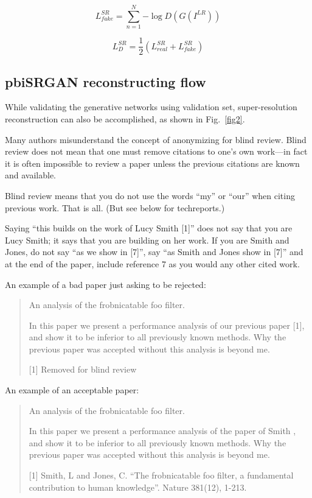 \documentclass[10pt,twocolumn,letterpaper]{article}
\begin{document}
\begin{equation}\label{8}
L_{fake}^{SR} = \sum\limits_{n = 1}^N { - \log D\left( {G\left( {{I^{LR}}} \right)} \right)}
\end{equation}

\begin{equation}\label{eq9}
L_D^{SR} = \frac{1}{2}\left( {L_{real}^{SR} + L_{fake}^{SR}} \right)
\end{equation}

\subsection{pbiSRGAN reconstructing flow}
While validating the generative networks using validation set, super-resolution reconstruction can also be accomplished, as shown in Fig.~\ref{fig2}.


Many authors misunderstand the concept of anonymizing for blind
review.  Blind review does not mean that one must remove
citations to one's own work---in fact it is often impossible to
review a paper unless the previous citations are known and
available.

Blind review means that you do not use the words ``my'' or ``our''
when citing previous work.  That is all.  (But see below for
techreports.)

Saying ``this builds on the work of Lucy Smith [1]'' does not say
that you are Lucy Smith; it says that you are building on her
work.  If you are Smith and Jones, do not say ``as we show in
[7]'', say ``as Smith and Jones show in [7]'' and at the end of the
paper, include reference 7 as you would any other cited work.

An example of a bad paper just asking to be rejected:
\begin{quote}
\begin{center}
    An analysis of the frobnicatable foo filter.
\end{center}

   In this paper we present a performance analysis of our
   previous paper [1], and show it to be inferior to all
   previously known methods.  Why the previous paper was
   accepted without this analysis is beyond me.

   [1] Removed for blind review
\end{quote}


An example of an acceptable paper:

\begin{quote}
\begin{center}
     An analysis of the frobnicatable foo filter.
\end{center}

   In this paper we present a performance analysis of the
   paper of Smith \etal [1], and show it to be inferior to
   all previously known methods.  Why the previous paper
   was accepted without this analysis is beyond me.

   [1] Smith, L and Jones, C. ``The frobnicatable foo
   filter, a fundamental contribution to human knowledge''.
   Nature 381(12), 1-213.
\end{quote}
\end{document}
